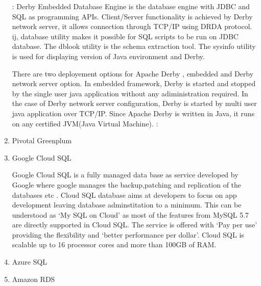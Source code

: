 \begin{enumerate}
\label{\detokenize{i524/technologies:id380}}{\hyperref[\detokenize{i524/technologies:www-apachederbycharter}]{\sphinxcrossref{{[}324{]}}}}: Derby Embedded Database Engine is
the database engine with JDBC and SQL as programming APIs.
Client/Server functionality is achieved by Derby network server,
it allows connection through TCP/IP using DRDA protocol. ij,
database utility makes it possible for SQL scripts to be run on
JDBC database. The dblook utility is the schema extraction
tool. The sysinfo utility is used for displaying version of Java
environment and Derby.

There are two deployement options for Apache Derby , embedded and
Derby network server option. In embedded framework, Derby is
started and stopped by the single user java application without
any adiministration required. In the case of Derby network server
configuration, Derby is started by multi user java application
over TCP/IP. Since Apache Derby is written in Java, it runs on
any certified JVM(Java Virtual Machine). \label{\detokenize{i524/technologies:id381}}{\hyperref[\detokenize{i524/technologies:www-derbymanual}]{\sphinxcrossref{{[}325{]}}}}:

\item {} 
Pivotal Greenplum

\item {} 
Google Cloud SQL

Google Cloud SQL is a fully managed data base as service
developed by Google where google manages the backup,patching and
replication of the databases etc
\label{\detokenize{i524/technologies:id382}}{\hyperref[\detokenize{i524/technologies:www-cloud-sql-google}]{\sphinxcrossref{{[}326{]}}}}. Cloud SQL database aims at
developers to focus on app development leaving database
adminstitation to a minimum. This can be understood as `My SQL
on Cloud' as most of the features from MySQL 5.7 are directly
supported in Cloud SQL. The service is offered with `Pay per
use' providing the flexibility and `better performance per
dollar'.  Cloud SQL is scalable up to 16 processor cores and
more than 100GB of RAM. \label{\detokenize{i524/technologies:id383}}{\hyperref[\detokenize{i524/technologies:www-cloud-sql-google-faq}]{\sphinxcrossref{{[}327{]}}}}

\item {} 
Azure SQL

\item {} 
Amazon RDS


\end{enumerate}
